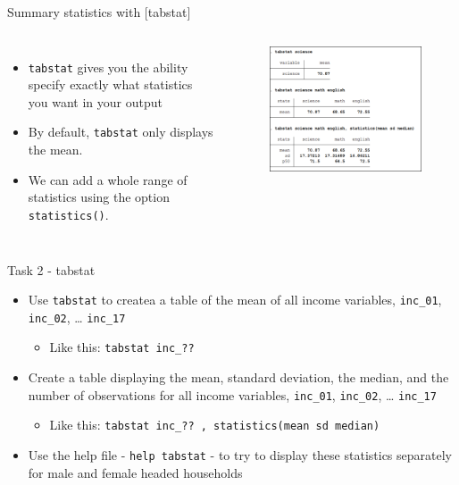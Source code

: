 \documentclass[aspectratio=169]{beamer}
\begin{document}
\begin{frame}[fragile]{Summary statistics with [tabstat]}
	\color{red}{Do we want a prettier image?}
	\begin{columns}[c]
		\begin{itemize}
			\item \texttt{tabstat} gives you the ability specify exactly what statistics you want in your output
			\item By default, \texttt{tabstat} only displays the mean. 
			\item We can add a whole range of statistics using the option \texttt{statistics()}. 			
		\end{itemize}
		\begin{figure}
			\centering
			\includegraphics[width=\linewidth]{img/tabstat}
		\end{figure}
	\end{columns}
\end{frame}

\begin{frame}{Task 2 - tabstat}
	\begin{itemize}
		\item Use \texttt{tabstat} to createa a table of the mean of all income variables, \texttt{inc\_01}, \texttt{inc\_02}, … \texttt{inc\_17}
		\begin{itemize}
			\item Like this: \texttt{tabstat inc\_??}
		\end{itemize}
		\item Create a table displaying the mean, standard deviation, the median, and the number of observations for all income variables, \texttt{inc\_01}, \texttt{inc\_02}, … \texttt{inc\_17}
		\begin{itemize}
			\item Like this: \texttt{tabstat inc\_?? , statistics(mean sd median)} 
		\end{itemize}
		\item Use the help file - \texttt{help tabstat} - to try to display these statistics separately for male and female headed households
	\end{itemize}
\end{frame}
\end{document}
